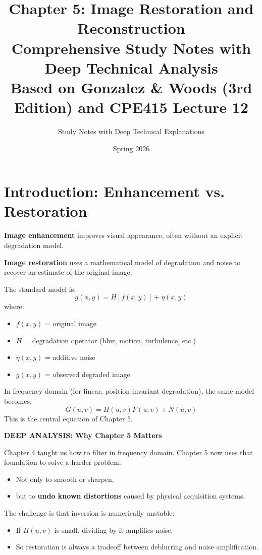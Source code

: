 \documentclass[12pt,a4paper]{article}
\title{\textbf{Chapter 5: Image Restoration and Reconstruction}\\
\Large Comprehensive Study Notes with Deep Technical Analysis\\
\normalsize Based on Gonzalez \& Woods (3rd Edition) and CPE415 Lecture 12}
\author{Study Notes with Deep Technical Explanations}
\date{Spring 2026}
\begin{document}
\maketitle
\tableofcontents
\newpage

\section{Introduction: Enhancement vs. Restoration}

\begin{conceptbox}
\textbf{Image enhancement} improves visual appearance, often without an explicit degradation model.

\textbf{Image restoration} uses a mathematical model of degradation and noise to recover an estimate of the original image.

The standard model is:
\[
g(x,y) = H[f(x,y)] + \eta(x,y)
\]
where:
\begin{itemize}
    \item $f(x,y)$ = original image
    \item $H$ = degradation operator (blur, motion, turbulence, etc.)
    \item $\eta(x,y)$ = additive noise
    \item $g(x,y)$ = observed degraded image
\end{itemize}
\end{conceptbox}

In frequency domain (for linear, position-invariant degradation), the same model becomes:
\[
G(u,v) = H(u,v)F(u,v) + N(u,v)
\]
This is the central equation of Chapter 5.

\begin{deepexplanation}
\textbf{DEEP ANALYSIS: Why Chapter 5 Matters}

Chapter 4 taught us how to filter in frequency domain. Chapter 5 now uses that foundation to solve a harder problem:
\begin{itemize}
    \item Not only to smooth or sharpen,
    \item but to \textbf{undo known distortions} caused by physical acquisition systems.
\end{itemize}

The challenge is that inversion is numerically unstable:
\begin{itemize}
    \item If $H(u,v)$ is small, dividing by it amplifies noise.
    \item So restoration is always a tradeoff between deblurring and noise amplification.
\end{itemize}
\end{deepexplanation}
\end{document}
